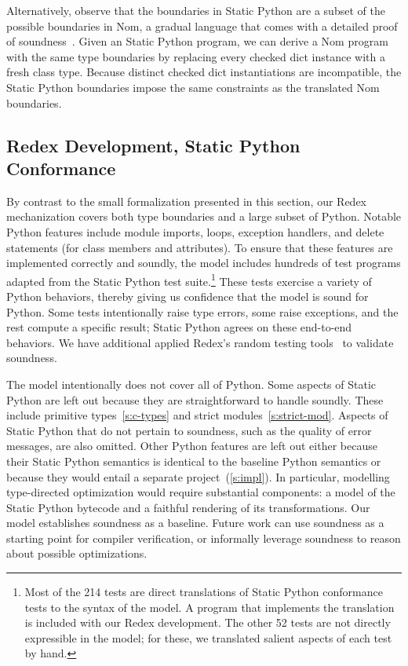 \documentclass[english,cleveref,submission]{programming}
\newcommand{\SP}{Static Python}
\begin{document}
Alternatively, observe that the boundaries in \SP{} are a subset
of the possible boundaries in Nom, a gradual language that comes with a detailed
proof of soundness~\cite{mt-oopsla-2017,mt-oopsla-2021}.
Given an \SP{} program, we can derive a Nom program with
the same type boundaries by replacing every checked dict instance
with a fresh class type.
Because distinct checked dict instantiations are incompatible,
the \SP{} boundaries impose the same constraints as the translated Nom
boundaries.


\subsection{Redex Development, \SP{} Conformance}
\label{s:redex}

By contrast to the small formalization presented in this section,
our Redex mechanization covers both type boundaries and a large subset of Python.
Notable Python features include module imports, loops, exception handlers, and
delete statements (for class members and attributes).
To ensure that these features are implemented correctly and soundly, the
model includes hundreds of test programs adapted from the \SP{} test suite.\footnote{
  Most of the 214 tests are direct translations of \SP{} conformance tests to
  the syntax of the model.
  A program that implements the translation is included with our Redex development.
  The other 52 tests are not directly expressible in the model; for these, we
  translated salient aspects of each test by hand.}
These tests exercise a variety of Python behaviors, thereby giving us confidence
that the model is sound for Python.
Some tests intentionally raise type errors, some raise exceptions, and the rest
compute a specific result; \SP{} agrees on these end-to-end behaviors.
We have additional applied Redex's random testing tools~\cite{kf-sfp-2009}
to validate soundness.

The model intentionally does not cover all of Python.
Some aspects of \SP{} are left out because they are straightforward to
handle soundly.
These include primitive types~\cref{s:c-types} and strict modules~\cref{s:strict-mod}.
Aspects of \SP{} that do not pertain to soundness, such as the quality of error messages,
are also omitted.
Other Python features are left out either because their \SP{} semantics is identical
to the baseline Python semantics or because they would entail a separate project~(\cref{s:impl}).
In particular, modelling type-directed optimization would require substantial
components: a model of the \SP{} bytecode and a faithful rendering of its
transformations.
Our model establishes soundness as a baseline.
Future work can use soundness as a starting point for compiler verification,
or informally leverage soundness to reason about possible optimizations.
\end{document}
